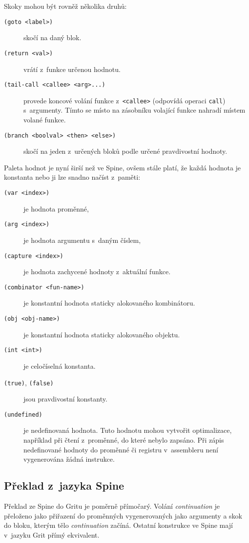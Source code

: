 Skoky mohou být rovněž několika druhů:

\begin{description}
  \item[\texttt{(goto <label>)}] skočí na daný blok.
  \item[\texttt{(return <val>)}] vrátí z~funkce určenou hodnotu.
  \item[\texttt{(tail-call <callee> <arg>...)}] provede koncové volání funkce
    z~\texttt{<callee>} (odpovídá operaci \texttt{call}) s~argumenty. Tímto se
    místo na zásobníku volající funkce nahradí místem volané funkce.
  \item[\texttt{(branch <boolval> <then> <else>)}] skočí na jeden z~určených
    bloků podle určené pravdivostní hodnoty.
\end{description}

Paleta hodnot je nyní širší než ve Spine, ovšem stále platí, že každá hodnota je
konstanta nebo ji lze snadno načíst z~paměti:

\begin{description}
  \item[\texttt{(var <index>)}] je hodnota proměnné,
  \item[\texttt{(arg <index>)}] je hodnota argumentu s~daným číslem,
  \item[\texttt{(capture <index>)}] je hodnota zachycené hodnoty z~aktuální funkce.
  \item[\texttt{(combinator <fun-name>)}] je konstantní hodnota staticky
    alokovaného kombinátoru.
  \item[\texttt{(obj <obj-name>)}] je konstantní hodnota staticky alokovaného
    objektu.
  \item[\texttt{(int <int>)}] je celočíselná konstanta.
  \item[\texttt{(true)}, \texttt{(false)}] jsou pravdivostní konstanty.
  \item[\texttt{(undefined)}] je nedefinovaná hodnota. Tuto hodnotu mohou
    vytvořit optimalizace, například při čtení z~proměnné, do které nebylo
    zapsáno. Při zápis nedefinované hodnoty do proměnné či registru v~assembleru
    není vygenerována žádná instrukce.
\end{description}

\subsection{Překlad z~jazyka Spine}

Překlad ze Spine do Gritu je poměrně přímočarý. Volání \emph{continuation} je
přeloženo jako přiřazení do proměnných vygenerovaných jako argumenty a skok do
bloku, kterým tělo \emph{continuation} začíná. Ostatní konstrukce ve Spine mají
v~jazyku Grit přímý ekvivalent.

